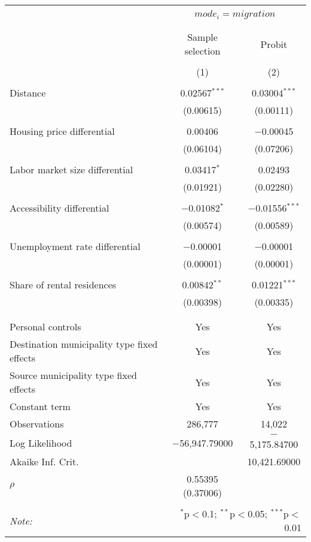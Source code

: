 
\begin{table}[!htbp] \centering 
  \caption{} 
  \label{} 
\begin{tabular}{@{\extracolsep{5pt}}lcc} 
\\[-1.8ex]\hline 
\hline \\[-1.8ex] 
 & \multicolumn{2}{c}{$mode_i = migration$} \\ 
\cline{2-3} 
\\[-1.8ex] &  &  \\ 
 & Sample selection & Probit \\ 
\\[-1.8ex] & (1) & (2)\\ 
\hline \\[-1.8ex] 
 Distance & 0.02567$^{***}$ & 0.03004$^{***}$ \\ 
  & (0.00615) & (0.00111) \\ 
  & & \\ 
 Housing price differential & 0.00406 & $-$0.00045 \\ 
  & (0.06104) & (0.07206) \\ 
  & & \\ 
 Labor market size differential & 0.03417$^{*}$ & 0.02493 \\ 
  & (0.01921) & (0.02280) \\ 
  & & \\ 
 Accessibility differential & $-$0.01082$^{*}$ & $-$0.01556$^{***}$ \\ 
  & (0.00574) & (0.00589) \\ 
  & & \\ 
 Unemployment rate differential & $-$0.00001 & $-$0.00001 \\ 
  & (0.00001) & (0.00001) \\ 
  & & \\ 
 Share of rental residences & 0.00842$^{**}$ & 0.01221$^{***}$ \\ 
  & (0.00398) & (0.00335) \\ 
  & & \\ 
\hline \\[-1.8ex] 
Personal controls & Yes & Yes \\ 
Destination municipality type fixed effects & Yes & Yes \\ 
Source municipality type fixed effects & Yes & Yes \\ 
Constant term & Yes & Yes \\ 
Observations & 286,777 & 14,022 \\ 
Log Likelihood & $-$56,947.79000 & $-$5,175.84700 \\ 
Akaike Inf. Crit. &  & 10,421.69000 \\ 
$\rho$ & 0.55395  (0.37006) &  \\ 
\hline 
\hline \\[-1.8ex] 
\textit{Note:}  & \multicolumn{2}{r}{$^{*}$p$<$0.1; $^{**}$p$<$0.05; $^{***}$p$<$0.01} \\ 
\end{tabular} 
\end{table} 
